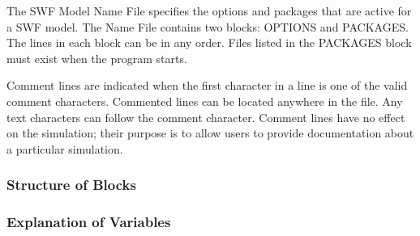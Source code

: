 The SWF Model Name File specifies the options and packages that are active for a SWF model.  The Name File contains two blocks: OPTIONS  and PACKAGES. The lines in each block can be in any order.  Files listed in the PACKAGES block must exist when the program starts. 

Comment lines are indicated when the first character in a line is one of the valid comment characters.  Commented lines can be located anywhere in the file. Any text characters can follow the comment character. Comment lines have no effect on the simulation; their purpose is to allow users to provide documentation about a particular simulation. 

\vspace{5mm}
\subsubsection{Structure of Blocks}



\vspace{5mm}
\subsubsection{Explanation of Variables}
\begin{description}

\end{description}

